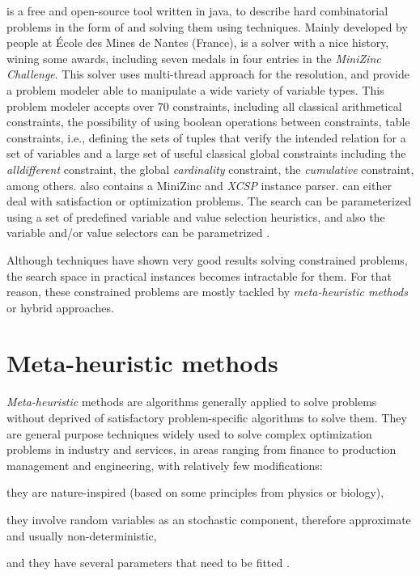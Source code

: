 \choco{} is a free and open-source tool written in java, to describe hard combinatorial problems in the form of \csps{} and solving them using \CP{} techniques. Mainly developed by people at \'Ecole des Mines de Nantes (France), is a solver with a nice history, wining some awards, including seven medals in four entries in the \textit{MiniZinc Challenge}. This solver uses multi-thread approach for the resolution, and provide a problem modeler able to manipulate a wide variety of variable types. This problem modeler accepts over 70 constraints, including all classical arithmetical constraints, the possibility of using boolean operations between constraints, table constraints, i.e., defining the sets of tuples that verify the intended relation for a set of variables and a large set of useful classical global constraints including the \textit{alldifferent} constraint, the global \textit{cardinality} constraint, the \textit{cumulative} constraint, among others. \choco{} also contains a {\sc MiniZinc} and \textit{XCSP} instance parser. 
\choco{} can either deal with satisfaction or optimization problems. The search can be parameterized using a set of predefined variable and value selection heuristics, and also the variable and/or value selectors can be parametrized \cite{Jussien2008, Prudhomme2016}.

Although \cp{} techniques have shown very good results solving constrained problems, the search space in practical instances becomes intractable for them. For that reason, these constrained problems are mostly tackled by {\it meta-heuristic methods} or hybrid approaches. %

\section{Meta-heuristic methods}
\label{sec:meta}

{\it Meta-heuristic} methods are algorithms generally applied to solve problems without deprived of satisfactory problem-specific algorithms to solve them. They are general purpose techniques widely used to solve complex optimization problems in industry and services, in areas ranging from finance to production management and engineering, with relatively few modifications: \begin{inparaenum}[i)] \item they are nature-inspired (based on some principles from physics or biology), \item they involve random variables as an stochastic component, therefore approximate and usually non-deterministic, \item and they have several parameters that need to be fitted \cite{Dreo2006}.\end{inparaenum} 

